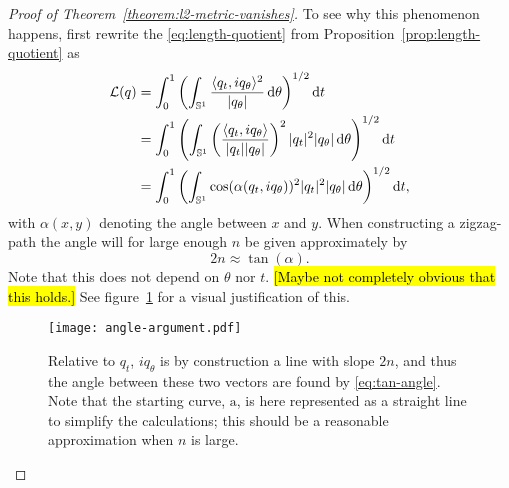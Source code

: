 \begin{proof}[Proof of Theorem~\ref{theorem:l2-metric-vanishes}]
  To see why this  phenomenon happens, first rewrite the \eqref{eq:length-quotient} from Proposition~\ref{prop:length-quotient} as
  \begin{align*}
    \mathcal{L}(q) &
                     = \int_{0}^{1}
                     \left(
                     \int_{\mathbb{S}^{1}} \frac{\langle q_{t},i q_{\theta}\rangle^2}
                     {|q_{\theta}|}  \mathop{}\!\mathrm{d} \theta
                     \right)^{1/2} \mathop{}\!\mathrm{d} t \\
                   & =  \int_{0}^{1}
                     \left(
                     \int_{\mathbb{S}^{1}}
                     \left(
                     \frac{\langle q_{t},i
                     q_{\theta}\rangle}{| q_{t}|| q_{\theta}|}
                     \right)^2
                     | q_t|^2   | q_{\theta}|
                     \mathop{}\!\mathrm{d} \theta
                     \right)^{1/2} \mathop{}\!\mathrm{d} t \\
                   &  =
                     \int_{0}^{1}
                     \left(
                     \int_{\mathbb{S}^{1}}
                     \cos(\alpha( q_t, i q_{\theta}))^2
                     | q_t|^2   | q_{\theta}|
                     \mathop{}\!\mathrm{d} \theta
                     \right)^{1/2}\mathop{}\!\mathrm{d} t,
  \end{align*}
  with $\alpha(x,y)$ denoting the angle between $x$ and $y$.
  When constructing a zigzag-path the angle will for large enough $n$ be given approximately by
  \begin{equation}
    \label{eq:tan-angle}
    2n \approx \tan(\alpha).
  \end{equation}
  Note that this does not depend on $\theta$ nor $t$.
  \hl{[Maybe not completely obvious that this holds.]}
  See figure~\ref{fig:angle-arg} for a visual justification of this.
  \begin{figure}[h]
    \centering
    \texttt{[image: angle-argument.pdf]}
    \caption{Relative to $q_t$, $iq_{\theta}$ is by construction a line with slope $2n$, and thus the angle between these two vectors are found by \eqref{eq:tan-angle}. Note that the starting curve, $\mathrm{a}$, is here represented as a straight line to simplify the calculations; this should be a reasonable approximation when $n$ is large.}
    \label{fig:angle-arg}
  \end{figure}


\end{proof}
